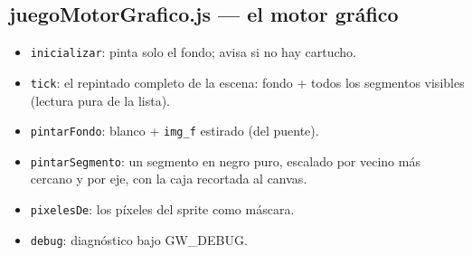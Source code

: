 \documentclass[../main.tex]{subfiles}
\begin{document}
\subsection*{juegoMotorGrafico.js — el motor gráfico}

\begin{itemize}
	\item \texttt{inicializar}: pinta solo el fondo; avisa si no hay
	cartucho.
	\item \texttt{tick}: el repintado completo de la escena: fondo + todos
	los segmentos visibles (lectura pura de la lista).
	\item \texttt{pintarFondo}: blanco + \texttt{img\_f} estirado (del
	puente).
	\item \texttt{pintarSegmento}: un segmento en negro puro, escalado
	por vecino más cercano y por eje, con la caja recortada al canvas.
	\item \texttt{pixelesDe}: los píxeles del sprite como máscara.
	\item \texttt{debug}: diagnóstico bajo GW\_DEBUG.
\end{itemize}
	
	\clearpage
	
\end{document}
